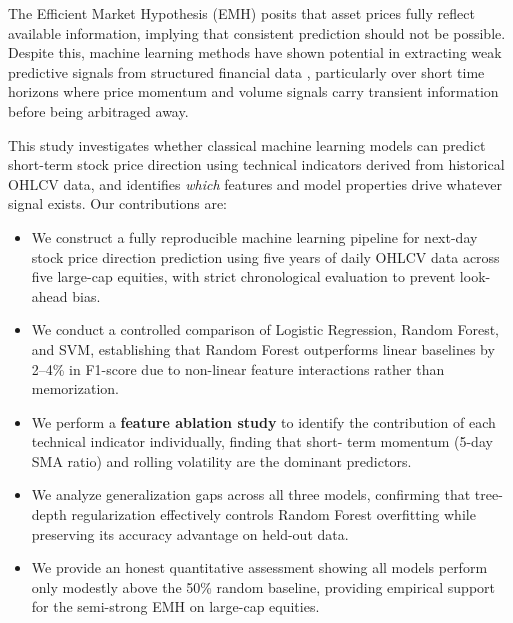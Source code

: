 \documentclass{article}
\begin{document}
The Efficient Market Hypothesis (EMH) \citep{fama1970} posits that asset prices
fully reflect available information, implying that consistent prediction should
not be possible. Despite this, machine learning methods have shown potential in
extracting weak predictive signals from structured financial data
\citep{fischer2018}, particularly over short time horizons where price momentum
and volume signals carry transient information before being arbitraged away.

This study investigates whether classical machine learning models can predict
short-term stock price direction using technical indicators derived from
historical OHLCV data, and identifies \emph{which} features and model properties
drive whatever signal exists. Our contributions are:

\begin{itemize}
    \item We construct a fully reproducible machine learning pipeline for
    next-day stock price direction prediction using five years of daily OHLCV
    data across five large-cap equities, with strict chronological evaluation
    to prevent look-ahead bias.

    \item We conduct a controlled comparison of Logistic Regression, Random
    Forest, and SVM, establishing that Random Forest outperforms linear
    baselines by 2--4\% in F1-score due to non-linear feature interactions
    rather than memorization.

    \item We perform a \textbf{feature ablation study} to identify the
    contribution of each technical indicator individually, finding that short-
    term momentum (5-day SMA ratio) and rolling volatility are the dominant
    predictors.

    \item We analyze generalization gaps across all three models, confirming
    that tree-depth regularization effectively controls Random Forest
    overfitting while preserving its accuracy advantage on held-out data.

    \item We provide an honest quantitative assessment showing all models
    perform only modestly above the 50\% random baseline, providing empirical
    support for the semi-strong EMH on large-cap equities.
\end{itemize}

\end{document}
